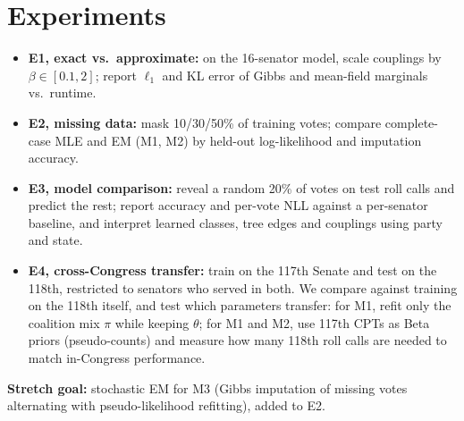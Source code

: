 \documentclass[10pt,twocolumn]{article}
\begin{document}
\section{Experiments}
\begin{itemize}
\item \textbf{E1, exact vs.\ approximate:} on the 16-senator model, scale couplings by
$\beta\in[0.1,2]$; report $\ell_1$ and KL error of Gibbs and mean-field marginals vs.\ runtime.
\item \textbf{E2, missing data:} mask 10/30/50\% of training votes; compare complete-case MLE and EM
(M1, M2) by held-out log-likelihood and imputation accuracy.
\item \textbf{E3, model comparison:} reveal a random 20\% of votes on test roll calls and predict the
rest; report accuracy and per-vote NLL against a per-senator baseline, and interpret learned classes,
tree edges and couplings using party and state.
\item \textbf{E4, cross-Congress transfer:} train on the 117th Senate and test on the 118th, restricted to
senators who served in both. We compare against training on the 118th itself, and test which parameters
transfer: for M1, refit only the coalition mix $\pi$ while keeping $\theta$; for M1 and M2, use 117th CPTs
as Beta priors (pseudo-counts) and measure how many 118th roll calls are needed to match in-Congress
performance.
\end{itemize}
\textbf{Stretch goal:} stochastic EM for M3 (Gibbs imputation of missing votes alternating with
pseudo-likelihood refitting), added to E2.
\end{document}
